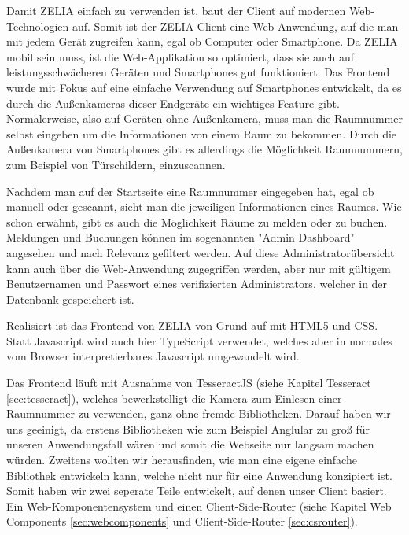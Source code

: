 
Damit ZELIA einfach zu verwenden ist, baut der Client auf modernen Web-Technologien auf. Somit ist der ZELIA Client eine Web-Anwendung, auf die man mit jedem Gerät zugreifen kann, egal ob Computer oder Smartphone. Da ZELIA mobil sein muss, ist die Web-Applikation so optimiert, dass sie auch auf leistungsschwächeren Geräten und Smartphones gut funktioniert. Das Frontend wurde mit Fokus auf eine einfache Verwendung auf Smartphones entwickelt, da es durch die Außenkameras dieser Endgeräte ein wichtiges Feature gibt. Normalerweise, also auf Geräten ohne Außenkamera, muss man die Raumnummer selbst eingeben um die Informationen von einem Raum zu bekommen. Durch die Außenkamera von Smartphones gibt es allerdings die Möglichkeit Raumnummern, zum Beispiel von Türschildern, einzuscannen. 

Nachdem man auf der Startseite eine Raumnummer eingegeben hat, egal ob manuell oder gescannt, sieht man die jeweiligen Informationen eines Raumes. Wie schon erwähnt, gibt es auch die Möglichkeit Räume zu melden oder zu buchen. Meldungen und Buchungen können im sogenannten "Admin Dashboard" angesehen und nach Relevanz gefiltert werden. Auf diese Administratorübersicht kann auch über die Web-Anwendung zugegriffen werden, aber nur mit gültigem Benutzernamen und Passwort eines verifizierten Administrators, welcher in der Datenbank gespeichert ist.

Realisiert ist das Frontend von ZELIA von Grund auf mit HTML5 und CSS. Statt Javascript wird auch hier TypeScript verwendet, welches aber in normales vom Browser interpretierbares Javascript umgewandelt wird. 

Das Frontend läuft mit Ausnahme von TesseractJS (siehe Kapitel Tesseract \ref{sec:tesseract}), welches bewerkstelligt die Kamera zum Einlesen einer Raumnummer zu verwenden, ganz ohne fremde Bibliotheken. Darauf haben wir uns geeinigt, da erstens Bibliotheken wie zum Beispiel Anglular zu groß für unseren Anwendungsfall wären und somit die Webseite nur langsam machen würden. Zweitens wollten wir herausfinden, wie man eine eigene einfache Bibliothek entwickeln kann, welche nicht nur für eine Anwendung konzipiert ist. Somit haben wir zwei seperate Teile entwickelt, auf denen unser Client basiert. Ein Web-Komponentensystem und einen Client-Side-Router (siehe Kapitel Web Components \ref{sec:webcomponents} und Client-Side-Router \ref{sec:csrouter}).
